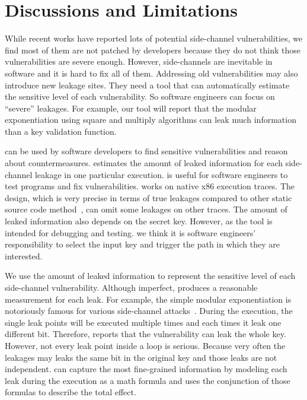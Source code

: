 \section{Discussions and Limitations}
While recent works have reported lots
of potential side-channel vulnerabilities, we find most of them are not patched by
developers because they do not think those vulnerabilities are severe enough.
However, side-channels are inevitable in software and it is hard to fix all of them. 
Addressing old vulnerabilities may also introduce new leakage
sites. They need a
tool that can automatically estimate the sensitive level of each vulnerability.
So software engineers can focus on
``severe'' leakages. For example, our tool will report that 
the modular exponentiation using square and multiply algorithms can
leak much information than a key validation function.

\tool{} can be used by software developers to find sensitive vulnerabilities
and reason about countermeasures.
\tool{} estimates the amount of leaked information for each side-channel leakage
in one particular execution. \tool{} is useful for software
engineers to test programs and fix vulnerabilities.
\tool{} works on native x86 execution traces. The design, which is very
precise in terms of true leakages compared to other static source code
method~\cite{197207,BacelarAlmeida:2013:FVS:2483313.2483334}, can omit some
leakages on other traces. The amount of leaked information also depends on the secret key.
However, as the tool is intended for debugging and testing.
we think it is software engineers' responsibility to select the input key and trigger the 
path in which they are interested.

We use the amount of leaked information to represent the sensitive level of each
side-channel vulnerability. Although imperfect, \tool{} produces a reasonable
measurement for each leak. For example, the simple modular exponentiation is notoriously
famous for various side-channel attacks~\cite{kocher1996timing}. During the execution, the single 
leak points will be executed multiple times and each times it leak one different bit.
Therefore, \tool{} reports that the vulnerability can leak the whole key. However, not every
leak point inside a loop is serious. Because very often the leakages may leaks the same
bit in the original key and those leaks are not independent. \tool{} can capture the most 
fine-grained information by
modeling each leak during the execution 
as a math formula and uses the conjunction of those formulas to describe the total effect.

